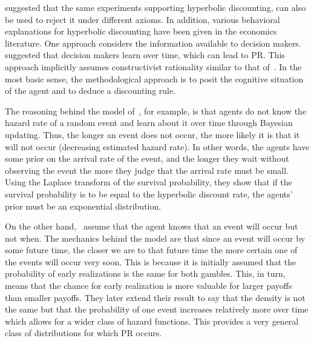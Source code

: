 \documentclass[11pt]{article}
\numberwithin{equation}{section}
\begin{document}
\citet{rubinstein2003economics} suggested that the same experiments supporting hyperbolic discounting, can also be used to reject it under different axioms. In addition, various behavioral explanations for hyperbolic discounting have been given in the economics literature. One approach considers the information available to decision makers.~\citet{sozou1998hyperbolic,dasgupta2005uncertainty} suggested that decision makers learn over time, which can lead to PR. This approach implicitly assumes constructivist rationality similar to that of~\citet{smith2003constructivist}. In the most basic sense, the methodological approach is to posit the cognitive situation of the agent and to deduce a discounting rule.

The reasoning behind the model of~\citet{sozou1998hyperbolic}, for example, is that agents do not know the hazard rate of a random event and learn about it over time through Bayesian updating. Thus, the longer an event does not occur, the more likely it is that it will not occur (decreasing estimated hazard rate). In other words, the agents have some prior on the arrival rate of the event, and the longer they wait without observing the event the more they judge that the arrival rate must be small. Using the Laplace transform of the survival probability, they show that if the survival probability is to be equal to the hyperbolic discount rate, the agents' prior must be an exponential distribution. 


On the other hand,~\citet{dasgupta2005uncertainty} assume that the agent knows that an event will occur but not when. The mechanics behind the model are that since an event will occur by some future time, the closer we are to that future time the more certain one of the events will occur very soon. This is because it is initially assumed that the probability of early realizations is the same for both gambles. This, in turn, means that the chance for early realization is more valuable for larger payoffs than smaller payoffs. They later extend their result to say that the density is not the same but that the probability of one event increases relatively more over time which allows for a wider class of hazard functions. This provides a very general class of distributions for which PR occurs. 
\end{document}
